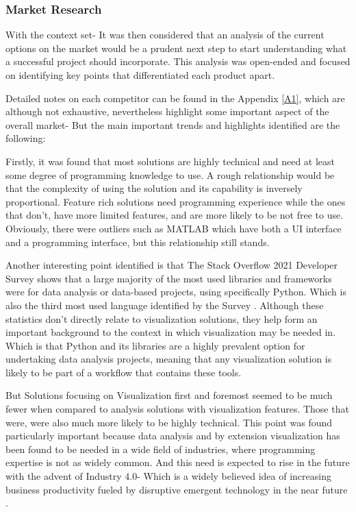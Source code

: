 \subsubsection{Market Research} \label{marketresearch}

With the context set- It was then considered that an analysis of the current options on the market would be a prudent next step to start understanding what a successful project should incorporate. This analysis was open-ended and focused on identifying key points that differentiated each product apart.

Detailed notes on each competitor can be found in the Appendix \ref{A1}, which are although not exhaustive, nevertheless highlight some important aspect of the overall market- But the main important trends and highlights identified are the following:

Firstly, it was found that most solutions are highly technical and need at least some degree of programming knowledge to use. A rough relationship would be that the complexity of using the solution and its capability is inversely proportional. Feature rich solutions need programming experience while the ones that don’t, have more limited features, and are more likely to be not free to use. Obviously, there were outliers such as MATLAB which have both a UI interface and a programming interface, but this relationship still stands.

Another interesting point identified is that The Stack Overflow 2021 Developer Survey \cite[]{stackoverflow_2021_stack} shows that a large majority of the most used libraries and frameworks were for data analysis or data-based projects, using specifically Python. Which is also the third most used language identified by the Survey \cite[]{stackoverflow_2021_stack}. Although these statistics don’t directly relate to visualization solutions, they help form an important background to the context in which visualization may be needed in. Which is that Python and its libraries are a highly prevalent option for undertaking data analysis projects, meaning that any visualization solution is likely to be part of a workflow that contains these tools.

But Solutions focusing on Visualization first and foremost seemed to be much fewer when compared to analysis solutions with visualization features. Those that were, were also much more likely to be highly technical. This point was found particularly important because data analysis and by extension visualization has been found to be needed in a wide field of industries, where programming expertise is not as widely common. And this need is expected to rise in the future with the advent of Industry 4.0- Which is a widely believed idea of increasing business productivity fueled by disruptive emergent technology in the near future \cite[]{GHOBAKHLOO2020119869}.

